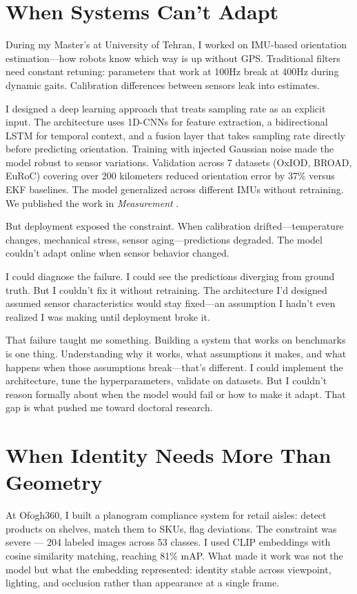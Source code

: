 \documentclass[11pt,a4paper]{article}
\begin{document}
\section*{When Systems Can't Adapt}

During my Master's at University of Tehran, I worked on IMU-based orientation estimation—how robots know which way is up without GPS. Traditional filters need constant retuning: parameters that work at 100Hz break at 400Hz during dynamic gaits. Calibration differences between sensors leak into estimates.

I designed a deep learning approach that treats sampling rate as an explicit input. The architecture uses 1D-CNNs for feature extraction, a bidirectional LSTM for temporal context, and a fusion layer that takes sampling rate directly before predicting orientation. Training with injected Gaussian noise made the model robust to sensor variations. Validation across 7 datasets (OxIOD, BROAD, EuRoC) covering over 200 kilometers reduced orientation error by 37\% versus EKF baselines. The model generalized across different IMUs without retraining. We published the work in \textit{Measurement} \cite{golroudbari2023imu}.

But deployment exposed the constraint. When calibration drifted—temperature changes, mechanical stress, sensor aging—predictions degraded. The model couldn't adapt online when sensor behavior changed.

I could diagnose the failure. I could see the predictions diverging from ground truth. But I couldn't fix it without retraining. The architecture I'd designed assumed sensor characteristics would stay fixed—an assumption I hadn't even realized I was making until deployment broke it. 

That failure taught me something. Building a system that works on benchmarks is one thing. Understanding why it works, what assumptions it makes, and what happens when those assumptions break—that's different. I could implement the architecture, tune the hyperparameters, validate on datasets. But I couldn't reason formally about when the model would fail or how to make it adapt. That gap is what pushed me toward doctoral research. 

\section*{When Identity Needs More Than Geometry}

At Ofogh360, I built a planogram compliance system for retail aisles: 
detect products on shelves, match them to SKUs, flag deviations. The 
constraint was severe — 204 labeled images across 53 classes. I used 
CLIP embeddings with cosine similarity matching, reaching 81\% mAP. 
What made it work was not the model but what the embedding represented: 
identity stable across viewpoint, lighting, and occlusion rather than 
appearance at a single frame.
\end{document}
